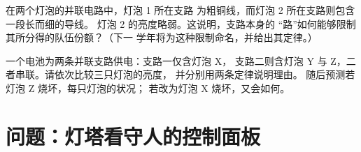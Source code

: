 \begin{exercise}[$\star\star$]\label{exo:g7:circuits-series-parallel:11}
在两个灯泡的并联电路中，灯泡 1 所在支路
为粗铜线，而灯泡 2 所在支路则包含一段长而细的导线。
灯泡 2 的亮度略弱。这说明，支路本身的
“路”如何能够限制其所分得的队伍份额？（下一
学年将为这种限制命名，并给出其定律。）
\end{exercise}

\begin{exercise}[$\star\star\star$]\label{exo:g7:circuits-series-parallel:12}
一个电池为两条并联支路供电：支路一仅含灯泡 X，
支路二则含灯泡 Y 与 Z，二者串联。请依次比较三只灯泡的亮度，
并分别用两条定律说明理由。
随后预测若灯泡 Z 烧坏，每只灯泡的状况；
若改为灯泡 X 烧坏，又会如何。
\end{exercise}

\section{问题：灯塔看守人的控制面板}

